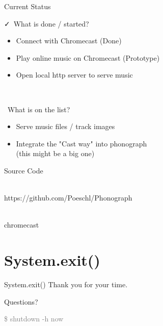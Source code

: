 \documentclass[final, english, xcolor=pdftex, dvipsnames, handout, table, aspectratio=169, 14pt]{beamer}
\begin{document}
\begin{frame}{Current Status}

\faCheck \, What is done / started?
\begin{itemize}
  \item Connect with Chromecast (Done)
  \item Play online music on Chromecast (Prototype)
  \item Open local http server to serve music
\end{itemize}\

\faHourglassHalf \, What is on the list?
\begin{itemize}
  \item Serve music files / track images
  \item Integrate the "Cast way" into phonograph\\(this might be a big one)
\end{itemize}

\end{frame}

\begin{frame}{Source Code}

\centering
\huge\faGithub\\\normalsize https://github.com/Poeschl/Phonograph\

\huge\faCodeFork\\\normalsize chromecast

\end{frame}

\section*{System.exit()}

\begin{frame}{System.exit()}
Thank you for your time.

\vspace{\baselineskip}Questions?

 {
\vspace{1.5\baselineskip}
\textcolor{gray}{\$ shutdown -h now}
}
\end{frame}
\end{document}
